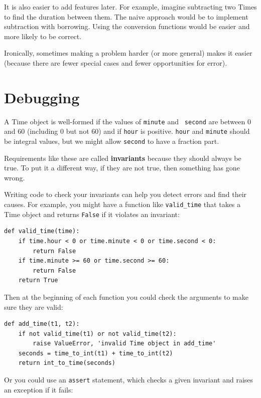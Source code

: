 \documentclass[10pt]{book}
\begin{document}
It is also easier to add features later.  For example, imagine
subtracting two Times to find the duration between them.  The
naive approach would be to implement subtraction with borrowing.
Using the conversion functions would be easier and more likely to be
correct.

Ironically, sometimes making a problem harder (or more general) makes it
easier (because there are fewer special cases and fewer opportunities
for error).


\section{Debugging}

A Time object is well-formed if the values of {\tt minute} and {\tt
second} are between 0 and 60 (including 0 but not 60) and if
{\tt hour} is positive.  {\tt hour} and {\tt minute} should be
integral values, but we might allow {\tt second} to have a
fraction part.

Requirements like these are called {\bf invariants} because
they should always be true.  To put it a different way, if they
are not true, then something has gone wrong.

Writing code to check your invariants can help you detect errors
and find their causes.  For example, you might have a function
like \verb"valid_time" that takes a Time object and returns
{\tt False} if it violates an invariant:

\begin{verbatim}
def valid_time(time):
    if time.hour < 0 or time.minute < 0 or time.second < 0:
        return False
    if time.minute >= 60 or time.second >= 60:
        return False
    return True
\end{verbatim}
%
Then at the beginning of each function you could check the
arguments to make sure they are valid:

\begin{verbatim}
def add_time(t1, t2):
    if not valid_time(t1) or not valid_time(t2):
        raise ValueError, 'invalid Time object in add_time'
    seconds = time_to_int(t1) + time_to_int(t2)
    return int_to_time(seconds)
\end{verbatim}
%
Or you could use an {\tt assert} statement, which checks a given invariant
and raises an exception if it fails:
\end{document}
